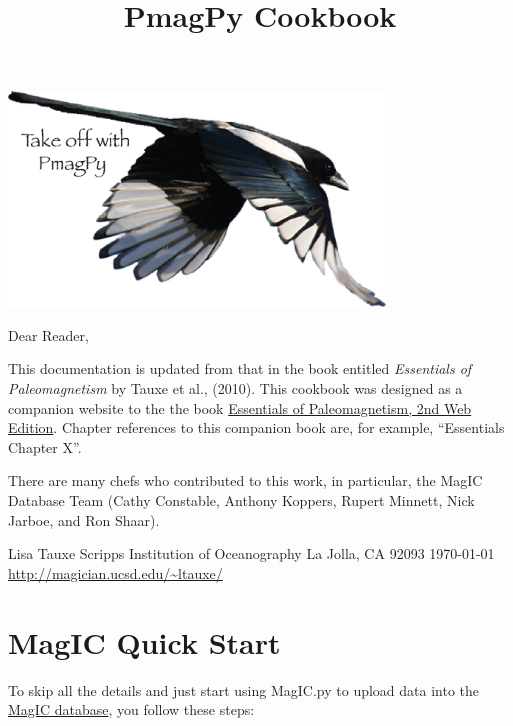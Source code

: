 \documentclass[11pt]{book}
\begin{document}
 \setcounter{tocdepth}{3}
\tableofcontents


{\hskip 1in \includegraphics[width=10cm]{EPSfiles/logo.eps}
 
 \title{PmagPy Cookbook}

 \maketitle
 Dear Reader,
 
 This documentation is updated from that in the book entitled {\it Essentials of Paleomagnetism} by  Tauxe et al., (2010). \nocite{tauxe10}  This cookbook was designed as a companion website to the  the book \href{http://magician.ucsd.edu/Essentials_2/WebBook2.html}{Essentials of Paleomagnetism, 2nd Web Edition}.   Chapter references to this companion book are, for example, ``Essentials Chapter X''.   
 
  There are many chefs who contributed to this work, in particular,  the MagIC Database Team (Cathy Constable, Anthony Koppers, Rupert Minnett, Nick Jarboe, and Ron Shaar).
 
{\obeylines 
 Lisa Tauxe
 Scripps Institution of Oceanography
 La Jolla, CA 92093
 \today
  \url{http://magician.ucsd.edu/~ltauxe/}
 }

\chapter{MagIC Quick Start}

 To skip all the details and just start using MagIC.py to upload data into the \href{#MagIC}{MagIC database}, you follow these steps:
 
}
\end{document}
